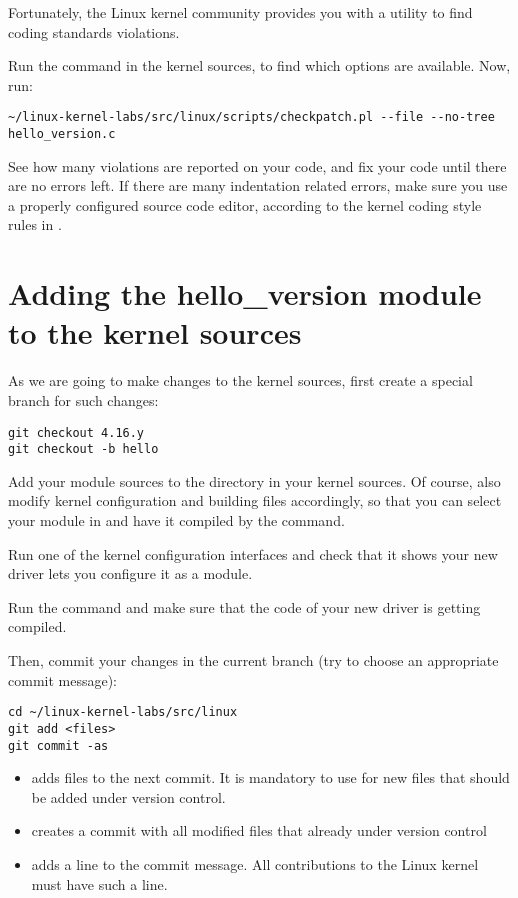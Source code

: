 Fortunately, the Linux kernel community provides you with a utility to
find coding standards violations.

Run the  command in the kernel sources,
to find which options are available.  Now, run:

\begin{verbatim}
~/linux-kernel-labs/src/linux/scripts/checkpatch.pl --file --no-tree hello_version.c
\end{verbatim}

See how many violations are reported on your code, and fix your code
until there are no errors left. If there are many indentation related
errors, make sure you use a properly configured source code editor,
according to the kernel coding style rules in
.

\section{Adding the hello\_version module to the kernel sources}

As we are going to make changes to the kernel sources, first create a
special branch for such changes:

\begin{verbatim}
git checkout 4.16.y
git checkout -b hello
\end{verbatim}

Add your module sources to the  directory in your
kernel sources. Of course, also modify kernel configuration and
building files accordingly, so that you can select your module in
 and have it compiled by the  command.

Run one of the kernel configuration interfaces and check that it
shows your new driver lets you configure it as a module.

Run the  command and make sure that the code of your new
driver is getting compiled.

Then, commit your changes in the current branch (try to choose an
appropriate commit message):

\begin{verbatim}
cd ~/linux-kernel-labs/src/linux
git add <files>
git commit -as
\end{verbatim}

\begin{itemize}
\item {} adds files to the next commit. It is mandatory to
  use for new files that should be added under version control.
\item {} creates a commit with all modified files
  that already under version control
\item {} adds a  line to the
      commit message. All contributions to the Linux kernel must have
      such a line.
\end{itemize}


